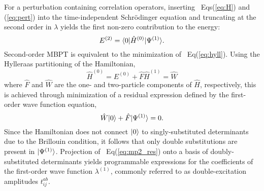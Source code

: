 For a perturbation containing correlation operators, 
inserting ~Eqs(\ref{eq:H}) and (\ref{eq:pert}) into the time-independent Schr\"odinger equation and truncating at the 
second order in $\lambda$ yields the first non-zero contribution to the energy:
\begin{equation} \label{eq:hyll}
    E^{(2)} = \langle0 |\hat{H}^{(0)}| \Psi^{(1)} \rangle.
\end{equation}
Second-order MBPT is equivalent to the minimization of ~Eq(\ref{eq:hyll}). 
Using the Hylleraas partitioning of the Hamiltonian,
\begin{subequations}
    \begin{equation}
        \hat{H}^{(0)} = E^{(0)} + \hat{F}
    \end{equation}
    \begin{equation}
        \hat{H}^{(1)} = \hat{W}
    \end{equation}
\end{subequations}
where $\hat{F}$ and $\hat{W}$ are the one- and two-particle components of $\hat{H}$, respectively, 
this is achieved through minimization of a residual expression defined by the first-order wave 
function equation,
\begin{equation} \label{eq:mp2_res}
    \hat{W}| 0 \rangle + \hat{F}| \Psi^{(1)} \rangle = 0.
\end{equation}
Since the Hamiltonian does not connect $| 0 \rangle$ to singly-substituted determinants due to the Brillouin condition, it follows that only double substitutions are present in $| \Psi^{(1)} \rangle$. 
Projection of ~Eq(\ref{eq:mp2_res}) onto a basis of doubly-substituted determinants yields programmable expressions for the coefficients of the first-order wave function $\lambda^{(1)}$, 
commonly referred to as double-excitation amplitudes $t^{ab}_{ij}$. 

